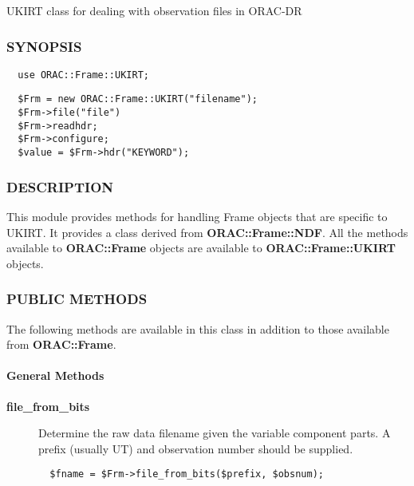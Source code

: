 \begin{description}
UKIRT class for dealing with observation files in ORAC-DR

\subsubsection*{SYNOPSIS\label{ORAC::Frame::UKIRT_SYNOPSIS}}
\begin{verbatim}
  use ORAC::Frame::UKIRT;
\end{verbatim}
\begin{verbatim}
  $Frm = new ORAC::Frame::UKIRT("filename");
  $Frm->file("file")
  $Frm->readhdr;
  $Frm->configure;
  $value = $Frm->hdr("KEYWORD");
\end{verbatim}
\subsubsection*{DESCRIPTION\label{ORAC::Frame::UKIRT_DESCRIPTION}}


This module provides methods for handling Frame objects that
are specific to UKIRT. It provides a class derived from \textbf{ORAC::Frame::NDF}.
All the methods available to \textbf{ORAC::Frame} objects are available
to \textbf{ORAC::Frame::UKIRT} objects.

\subsubsection*{PUBLIC METHODS\label{ORAC::Frame::UKIRT_PUBLIC_METHODS}}


The following methods are available in this class in addition to
those available from \textbf{ORAC::Frame}.

\paragraph*{General Methods\label{ORAC::Frame::UKIRT_General_Methods}}
\begin{description}

\item[{\textbf{file\_from\_bits}}] \mbox{}

Determine the raw data filename given the variable component
parts. A prefix (usually UT) and observation number should
be supplied.

\begin{verbatim}
  $fname = $Frm->file_from_bits($prefix, $obsnum);
\end{verbatim}



\end{description}
\end{description}
